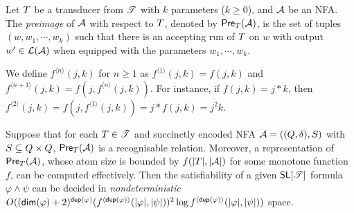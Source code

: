 

Let $T$ be a transducer from $\mathscr{T}$ with $k$ parameters ($k\geq 0$), and $\mathcal{A}$ be an NFA. The \emph{preimage} of $\mathcal{A}$ with respect to $T$, denoted by $\textsf{Pre}_{T}(\mathcal{A})$, is the set of tuples $(w, w_1,\cdots, w_k)$ such that there is an accepting run of $T$ on $w$ with output $w'\in \mathcal{L}(\mathcal{A})$ when equipped with the parameters $w_1,\cdots, w_k$. 


We define $f^{\langle n \rangle}(j, k)$ for $n\geq 1$ as $f^{\langle 1 \rangle}(j,k)= f(j, k)$ and $f^{\langle n+1 \rangle }(j, k) = f(j, f^{\langle n \rangle}(j,k))$. For instance, if $f(j, k) = j*k$, then $f^{\langle 2 \rangle}(j, k)= f(j, f^{\langle 1 \rangle}(j, k)) = j * f(j, k)= j^2k$.

\begin{theorem}\label{thm-generic-dec}
Suppose that %
for each $T \in \mathscr{T}$ and succinctly encoded NFA $\mathcal{A}=((Q, \delta), S)$ with $S \subseteq Q \times Q$, $\textsf{Pre}_{T}(\mathcal{A})$ is a recognisable relation.  Moreover, a representation of $\textsf{Pre}_{T}(\mathcal{A})$, whose atom size is bounded by $f(|T|, |\mathcal{A}|)$ for some monotone function $f$, can be computed effectively. %
 Then the satisfiability of a given $\textsf{SL}[\mathscr{T}]$ formula $\varphi \wedge \psi$ can be decided in \emph{nondeterministic} 
$O((\mathsf{dim}(\varphi)+2)^{\mathsf{dep}(\varphi)} (f^{\langle \mathsf{dep}(\varphi) \rangle}(|\varphi|, |\psi|))^2 \log f^{\langle \mathsf{dep}(\varphi) \rangle}(|\varphi|, |\psi|))$ space.
\end{theorem}

